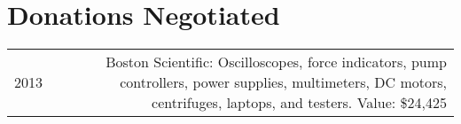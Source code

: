 \section*{Donations Negotiated}
\begin{tabular}{L!{\VRule}R}
2013&Boston Scientific: Oscilloscopes, force indicators, pump controllers, power supplies, multimeters, DC motors, centrifuges, laptops, and testers. Value: \$24,425\\
\end{tabular}